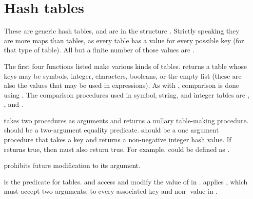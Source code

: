 \section{Hash tables}

These are generic hash tables, and are in the structure .
Strictly speaking they are more maps than tables, as every table has a
 value for every possible key (for that type of table).
All but a finite number of those values are .

\begin{protos}
\end{protos}
\noindent
The first four functions listed make various kinds of tables.
 returns a table whose keys may be symbols, integer,
 characters, booleans, or the empty list (these are also the values
 that may be used in  expressions).
As with , comparison is done using .
The comparison procedures used in symbol, string, and integer tables are
 , , and \code{=}.

 takes two procedures as arguments and returns
 a nullary table-making procedure.
 should be a two-argument equality predicate.
 should be a one argument procedure that takes a key
 and returns a non-negative integer hash value.
If  returns true,
 then 
 must also return true.
For example,  could be defined
 as .

 prohibits future modification to its argument.

\begin{protos}
\end{protos}
\noindent
{} is the predicate for tables.
 and  access and modify the value of 
 in .
 applies , which must accept two arguments,
 to every associated key and non- value in .

